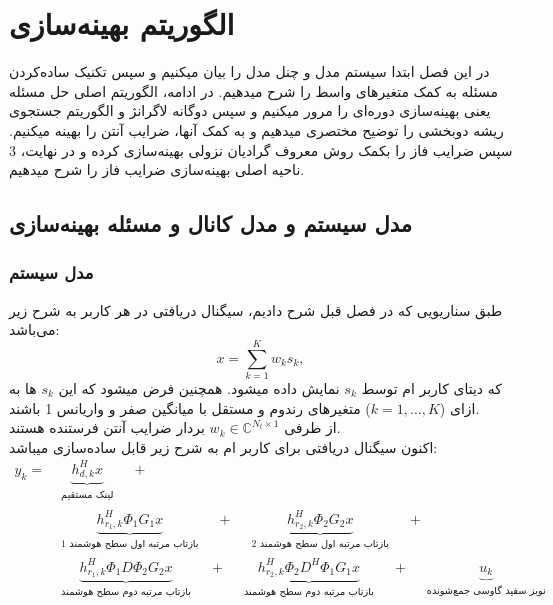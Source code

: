 \chapter{الگوریتم بهینه‌سازی}
در این فصل ابتدا سیستم مدل و چنل مدل را بیان میکنیم و سپس تکنیک ساده‌کردن مسئله به کمک متغیرهای واسط را شرح میدهیم. در ادامه، الگوریتم اصلی حل مسئله یعنی بهینه‌سازی دوره‌ای را مرور میکنیم و سپس دوگانه لاگرانژ و الگوریتم جستجوی ریشه دوبخشی را توضیح مختصری میدهیم و به کمک آنها، ضرایب آنتن را بهینه میکنیم. سپس ضرایب فاز را بکمک روش معروف گرادیان نزولی بهینه‌سازی کرده و در نهایت، 3 ناحیه اصلی بهینه‌سازی ضرایب فاز را شرح میدهیم. 
\newpage
\section{
	مدل سیستم و مدل کانال و مسئله بهینه‌سازی
}

\subsection{مدل سیستم}
طبق سناریویی که در فصل قبل شرح دادیم، سیگنال دریافتی در هر کاربر به شرح زیر می‌باشد:
\begin{equation}
	x = \sum_{k=1}^{K} w_k s_k, \label{eq:transmitted_signal}
\end{equation}
که دیتای کاربر  ام توسط $s_k$ نمایش داده میشود. همچنین فرض میشود که این $s_k$ ها به ازای ($k = 1, \ldots, K$) متغیرهای رندوم و مستقل با میانگین صفر و واریانس 1 باشند.\\
از طرفی $w_k \in \mathbb{C}^{N_t \times 1}$ بردار ضرایب آنتن فرستنده هستند.\\
اکنون سیگنال دریافتی برای کاربر  ام به شرح زیر قابل ساده‌سازی میباشد:
\begin{align*}
	y_k = &\underbrace{h_{d,k}^H x}_
	{\substack{\text{لینک مستقیم}}}
	\quad + \quad \\
	&\underbrace{h_{r_1,k}^H \Phi_1 G_1 x}_
	{\substack{\text{بازتاب مرتبه اول سطح هوشمند 1}}}
	\quad + \quad
	\underbrace{h_{r_2,k}^H \Phi_2 G_2 x}_
	{\substack{\text{بازتاب مرتبه اول سطح هوشمند 2}}}
	\quad + \quad \\ 
	&\underbrace{h_{r_1,k}^H \Phi_1 D \Phi_2 G_2 x}_
	{\substack{\text{بازتاب مرتبه دوم سطح هوشمند}}}
	\quad + \quad
	\underbrace{h_{r_2,k}^H \Phi_2 D^H \Phi_1 G_1 x}_
	{\substack{\text{بازتاب مرتبه دوم سطح هوشمند}}} \quad + \quad
	\underbrace{u_k}_
	{\substack{\text{نویز سفید گاوسی جمع‌شونده}}}
\end{align*}

